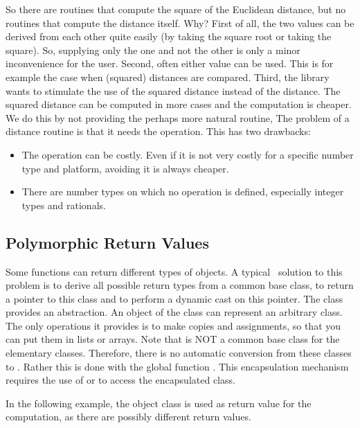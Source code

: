 So there are routines that compute the square of the Euclidean distance, but no
routines that compute the distance itself. Why?
First of all, the two values can be derived from each other quite easily (by
taking the square root or taking the square). So, supplying only the one and
not the other is only a minor inconvenience for the user.
Second, often either value can be used. This is for example the case when
(squared) distances are compared.
Third, the library wants to stimulate the use of the squared distance instead
of the distance. The squared distance can be computed in more cases and the
computation is cheaper.
We do this by not providing the perhaps more natural routine,
The problem of a distance routine is that it needs the 
operation.
This has two drawbacks:
\begin{itemize}
\item
The  operation can be costly. Even if it is not very costly for
a specific number type and platform, avoiding it is always cheaper.
\item
There are number types on which no  operation is defined,
especially integer types and rationals.
\end{itemize}

\subsection{Polymorphic Return Values}
Some functions can return different types of objects. A typical
\CC\ solution to this problem is to derive all possible return
types from a common base class, to return a pointer to this 
class and to perform a dynamic cast on this pointer. The class
 provides an abstraction.
An object  of the class  can
represent an arbitrary class. The only operations it provides is
to make copies and assignments, so that you can put them in lists
or arrays. Note that  is NOT a common base class for the
elementary classes. Therefore, there is no 
automatic conversion from these classes to . Rather 
this is done with the global function . This 
encapsulation mechanism requires the use of  or
 to access the encapsulated class.

\ccExample
In the following example, the object class is used as return value for the 
 computation, as there are possibly different return values.

